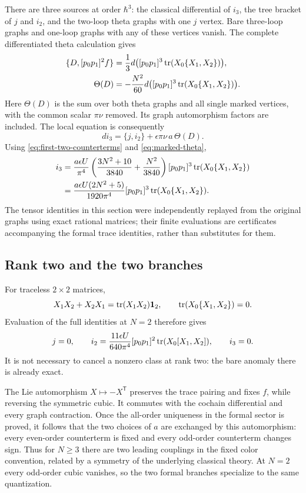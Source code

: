 There are three sources at order $\hbar^3$: the classical
differential of $i_3$, the tree bracket of $j$ and $i_2$, and the
two-loop theta graphs with one $j$ vertex. Bare three-loop graphs
and one-loop graphs with any of these vertices vanish.
The complete differentiated theta calculation gives
\begin{align}
 \{D,[p_0p_1]^2f\}
  &=\frac13d\bigl([p_0p_1]^3\operatorname{tr}(X_0\{X_1,X_2\})\bigr),\notag\\
 \Theta(D)
  &=-\frac{N^2}{60}
       d\bigl([p_0p_1]^3\operatorname{tr}(X_0\{X_1,X_2\})\bigr).
 \label{eq:marked-theta}
\end{align}
Here $\Theta(D)$ is the sum over both theta graphs and all
single marked vertices, with the common scalar $\pi\nu$
removed. Its graph automorphism factors are included.
The local equation is consequently
\[
 d i_3=\{j,i_2\}+\epsilon\pi\nu\,a\,\Theta(D).
\]
Using \eqref{eq:first-two-counterterms} and \eqref{eq:marked-theta},
\begin{align}
 i_3
 &=\frac{a\epsilon U}{\pi^4}
       \left(\frac{3N^2+10}{3840}+\frac{N^2}{3840}\right)
          [p_0p_1]^3\operatorname{tr}(X_0\{X_1,X_2\})\notag\\
 &=\frac{a\epsilon U(2N^2+5)}{1920\pi^4}
          [p_0p_1]^3\operatorname{tr}(X_0\{X_1,X_2\}).
 \label{eq:i3}
\end{align}
The tensor identities in this section were independently replayed
from the original graphs using exact rational matrices; their
finite evaluations are certificates accompanying the formal
trace identities, rather than substitutes for them.

\subsection{Rank two and the two branches}

For traceless $2\times2$ matrices,
\[
 X_1X_2+X_2X_1=\operatorname{tr}(X_1X_2)\mathbf1_2,\qquad
 \operatorname{tr}(X_0\{X_1,X_2\})=0 .
\]
Evaluation of the full identities at $N=2$ therefore gives
\begin{equation}
 j=0,\qquad
 i_2=\frac{11\epsilon U}{640\pi^4}
             [p_0p_1]^2\operatorname{tr}(X_0[X_1,X_2]),\qquad
 i_3=0.
 \label{eq:rank-two}
\end{equation}
It is not necessary to cancel a nonzero class at rank two:
the bare anomaly there is already exact.

The Lie automorphism $X\mapsto-X^{\mathsf T}$ preserves the trace
pairing and fixes $f$, while reversing the symmetric cubic.
It commutes with the cochain differential and every graph
contraction. Once the all-order uniqueness in the formal sector
is proved, it follows that the two choices of $a$ are exchanged
by this automorphism: every even-order counterterm is fixed and
every odd-order counterterm changes sign. Thus for $N\ge3$
there are two leading couplings in the fixed color convention,
related by a symmetry of the underlying classical theory.
At $N=2$ every odd-order cubic vanishes, so the two formal
branches specialize to the same quantization.
